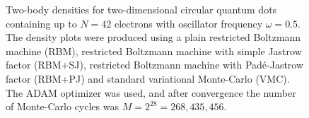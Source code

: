 \begin{landscape}
\begin{figure}
		\caption{Two-body densities for two-dimensional circular quantum dots containing up to $N=42$ electrons with oscillator frequency $\omega=0.5$. The density plots were produced using a plain restricted Boltzmann machine (RBM), restricted Boltzmann machine with simple Jastrow factor (RBM+SJ), restricted Boltzmann machine with Padé-Jastrow factor (RBM+PJ) and standard variational Monte-Carlo (VMC). The  ADAM optimizer was used, and after convergence the number of Monte-Carlo cycles was $M=2^{28}=268,435,456$.}%
		\label{fig:TB_2D_0p5w}
	\end{figure}
	\begin{figure}
		\centering
		\captionsetup[subfigure]{labelformat=empty}
		\hspace{0.1cm}
		\\
		

\end{figure}
\end{landscape}
